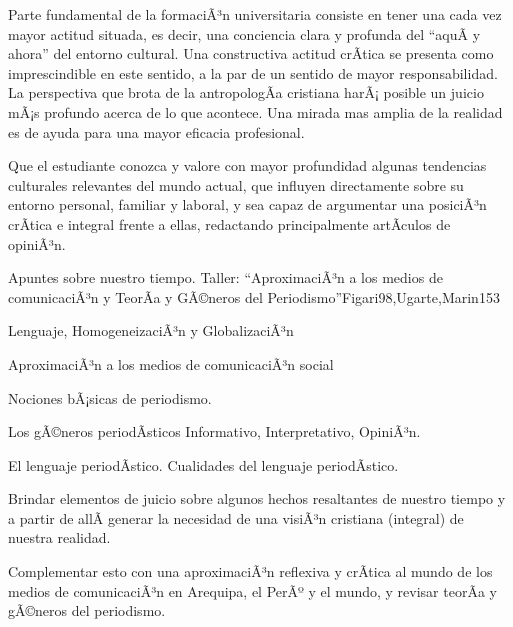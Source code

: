 \begin{syllabus}


\begin{justification}
Parte fundamental de la formaciÃ³n universitaria consiste en tener una cada vez mayor actitud situada, es decir, una conciencia clara y profunda del ``aquÃ­ y ahora'' del entorno cultural.  Una constructiva actitud crÃ­tica se presenta como imprescindible en este sentido, a la par de un sentido de mayor responsabilidad.  La perspectiva que brota de la antropologÃ­a cristiana harÃ¡ posible un juicio mÃ¡s profundo acerca de lo que acontece.  Una mirada mas amplia de la realidad es de ayuda para una mayor eficacia profesional.
\end{justification}

\begin{goals}
\item Que el estudiante conozca y valore con mayor profundidad algunas tendencias culturales relevantes del mundo actual, que influyen directamente sobre su entorno personal, familiar y laboral, y sea capaz de argumentar una posiciÃ³n crÃ­tica e integral frente a ellas, redactando principalmente artÃ­culos de opiniÃ³n.
\end{goals}

\begin{outcomes}
\end{outcomes}

\begin{unit}{Apuntes sobre nuestro tiempo. Taller: ``AproximaciÃ³n a los medios de comunicaciÃ³n y TeorÃ­a y GÃ©neros del Periodismo''}{Figari98,Ugarte,Marin}{15}{3}
\begin{topics}
	\item Lenguaje, HomogeneizaciÃ³n y GlobalizaciÃ³n
	\item AproximaciÃ³n a los medios de comunicaciÃ³n social
	\item Nociones bÃ¡sicas de periodismo.
	\item Los gÃ©neros periodÃ­sticos Informativo, Interpretativo, OpiniÃ³n.
	\item El lenguaje periodÃ­stico. Cualidades del lenguaje periodÃ­stico.
\end{topics}
\begin{unitgoals}
	\item Brindar elementos de juicio sobre algunos hechos resaltantes de nuestro tiempo y a partir de allÃ­ generar la necesidad de una visiÃ³n cristiana (integral) de nuestra realidad. 	
	\item Complementar esto con una aproximaciÃ³n reflexiva y crÃ­tica al mundo de los medios de comunicaciÃ³n en Arequipa, el PerÃº y el mundo, y revisar teorÃ­a y gÃ©neros del periodismo.
\end{unitgoals}
\end{unit}


\end{syllabus}
